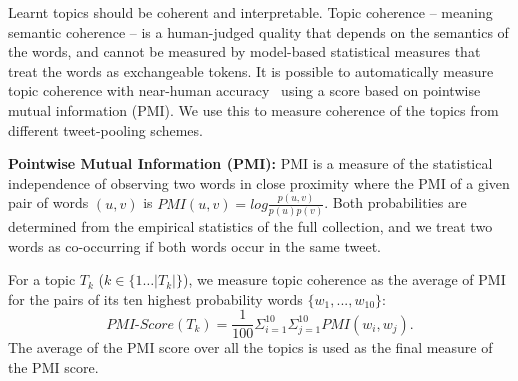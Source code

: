 \documentclass{sig-alternate}
\begin{document}
Learnt topics should be coherent and interpretable.  Topic coherence 
-- meaning semantic coherence -- is a human-judged quality that depends on
the semantics of the words, and cannot be measured by model-based
statistical measures that treat the words as exchangeable tokens.  It
is possible to automatically measure topic coherence with near-human
accuracy~\cite{baldwin10} using a score based on pointwise mutual
information (PMI).  We use this to measure coherence of the topics
from different tweet-pooling schemes.

\vspace{1mm} \noindent \textbf{Pointwise Mutual Information (PMI):} PMI is a
measure of the statistical independence of observing two words in
close proximity where the PMI of a given pair of words $(u,v)$ is $PMI
(u,v) = log \frac{p(u,v)}{p(u)p(v)}$.  Both probabilities are
determined from the empirical statistics of the full collection, and
we treat two words as co-occurring if both words occur in the same
tweet.

For a topic $T_k$ ($k \in \{ 1 \ldots |T_k| \}$), we measure topic
coherence as the average of PMI for the pairs of its ten highest
probability words $\{w_1,...,w_{10}\}$:
\begin{equation*}
	\mathit{PMI}\text{-}\mathit{Score}(T_k) = \frac{1}{100} \Sigma_{i=1}^{10} \Sigma_{j=1}^{10} PMI(w_i,w_j) .
\end{equation*}
The average of the PMI score over all the topics is used as the final
measure of the PMI score.

%
\end{document}
